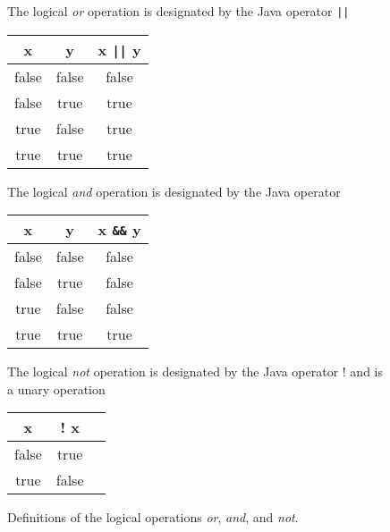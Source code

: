 




\begin {figure}[p]

The logical \emph {or} operation is 
designated by the Java operator \verb.||.
\begin {tabular} {c c c}
	  x & y & x \verb.||. y		\\
	\hline
	false & false & false		\\
	false & true  & true		\\
	true  & false & true		\\
	true  & true  & true		\\
\end {tabular}

\vspace{10pt}
The logical \emph {and} operation is 
designated by the Java operator %
\begin {tabular} {c c c}
	  x & y & x \verb.&&. y		\\
	\hline
	false & false & false		\\
	false & true  & false		\\
	true  & false & false		\\
	true  & true  & true		\\
\end {tabular}

\vspace{10pt}
The logical \emph {not} operation is 
designated by the Java operator ! 
and is a unary operation

\begin {tabular} {c c c}
	  x &  ! x   		\\
	\hline
	false & true		\\
	true  & false 		\\
\end {tabular}



\caption {Definitions of the logical 
operations \emph {or}, \emph {and},
and \emph {not}. }
\label {fig:boolOps}

\end {figure}


